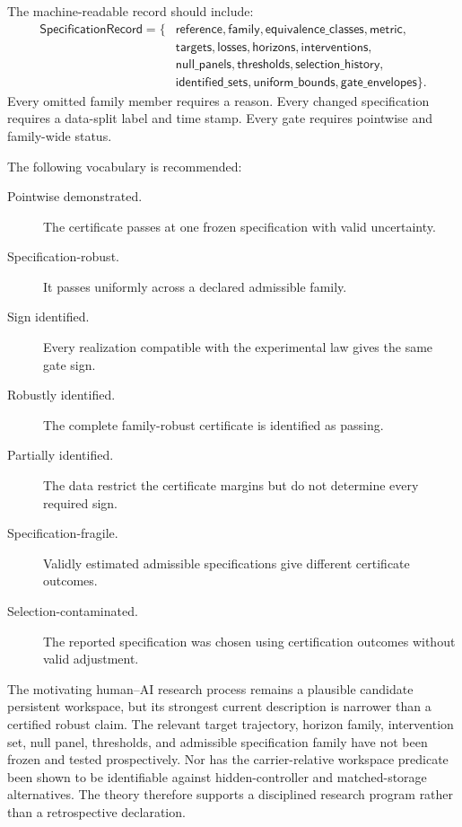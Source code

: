
The machine-readable record should include:
\[
\boxed{
\begin{aligned}
\mathsf{SpecificationRecord}
=\{&
\mathsf{reference},
\mathsf{family},
\mathsf{equivalence\_classes},
\mathsf{metric},\\
&\mathsf{targets},
\mathsf{losses},
\mathsf{horizons},
\mathsf{interventions},\\
&\mathsf{null\_panels},
\mathsf{thresholds},
\mathsf{selection\_history},\\
&\mathsf{identified\_sets},
\mathsf{uniform\_bounds},
\mathsf{gate\_envelopes}
\}.
\end{aligned}
}
\]
Every omitted family member requires a reason. Every changed specification
requires a data-split label and time stamp. Every gate requires pointwise and
family-wide status.


The following vocabulary is recommended:
\begin{description}
\item[Pointwise demonstrated.] The certificate passes at one frozen
 specification with valid uncertainty.
\item[Specification-robust.] It passes uniformly across a declared admissible
 family.
\item[Sign identified.] Every realization compatible with the experimental
 law gives the same gate sign.
\item[Robustly identified.] The complete family-robust certificate is
 identified as passing.
\item[Partially identified.] The data restrict the certificate margins but do
 not determine every required sign.
\item[Specification-fragile.] Validly estimated admissible specifications give
 different certificate outcomes.
\item[Selection-contaminated.] The reported specification was chosen using
 certification outcomes without valid adjustment.
\end{description}


The motivating human--AI research process remains a plausible candidate
persistent workspace, but its strongest current description is narrower than
a certified robust claim. The relevant target trajectory, horizon family,
intervention set, null panel, thresholds, and admissible specification family
have not been frozen and tested prospectively. Nor has the carrier-relative
workspace predicate been shown to be identifiable against hidden-controller
and matched-storage alternatives. The theory therefore supports a disciplined
research program rather than a retrospective declaration.

